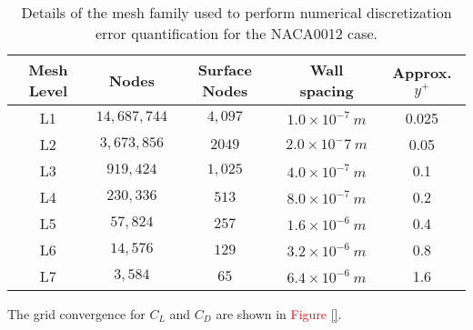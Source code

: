\begin{table}
    \renewcommand{\arraystretch}{1.2}
    \centering
    \begin{tabular}{ c|c|c|c|c } 
         Mesh Level & Nodes & Surface Nodes & Wall spacing & Approx. $y^+$  \\ 
         \hline
         L1 & $14,687,744$ & $4,097$ & $1.0\times10^{-7}~m$ & 0.025\\
         L2 & $3,673,856$ & $2049$ & $2.0\times10^-7~m$ & 0.05\\
         L3 & $919,424$ & $1,025$ & $4.0\times10^{-7}~m$ & 0.1\\
         L4 & $230,336$ & $513$ & $8.0\times10^{-7}~m$ & 0.2\\
         L5 & $57,824$ & $257$ & $1.6\times10^{-6}~m$ & 0.4\\
         L6 & $14,576$ & $129$ & $3.2\times10^{-6}~m$ & 0.8\\
         L7 & $3,584$ & $65$ & $6.4\times10^{-6}~m$ & 1.6\\
        
    \end{tabular}
    \caption{Details of the mesh family used to perform numerical discretization error quantification for the NACA0012 case.}
    \label{tab:naca0012_meshes}
\end{table}

The grid convergence for $C_L$ and $C_D$ are shown in \textcolor{red}{Figure \ref{}}.